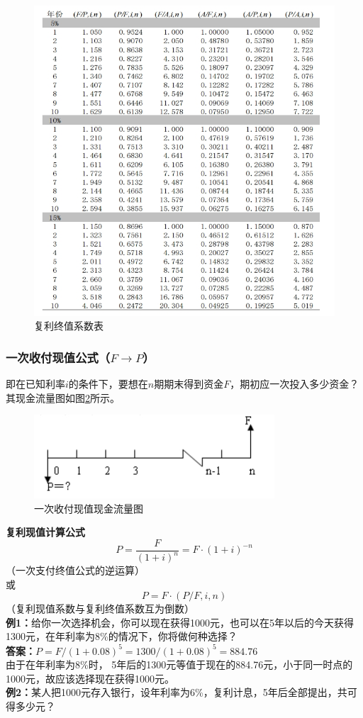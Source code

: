 \begin{figure}[H]
    \centering
    \includegraphics[width=\textwidth]{image/复利终值系数表.png}
    \caption{复利终值系数表}
    \label{fig:5}
\end{figure}

\subsubsection{一次收付现值公式（$F \to P$）}
即在已知利率$i$的条件下，要想在$n$期期末得到资金$F$，期初应一次投入多少资金？其现金流量图如图\ref{fig:6}所示。

\begin{figure}[H]
    \centering
    \includegraphics[width=0.8\textwidth]{image/一次收付现值现金流量图.png}
    \caption{一次收付现值现金流量图}
    \label{fig:6}
\end{figure}

\textbf{复利现值计算公式}
$$P=\frac{F}{(1+i)^n}=F \cdot (1+i)^{-n}$$（一次支付终值公式的逆运算）\\
或
$$P=F \cdot (P/F,i,n)$$（复利现值系数与复利终值系数互为倒数）\\
\textbf{例1：}给你一次选择机会，你可以现在获得1000元，也可以在5年以后的今天获得1300元，在年利率为8\%的情况下，你将做何种选择？\\
\textbf{答案：}$P=F/(1+0.08)^5=1300/(1+0.08)^5=884.76$\\
由于在年利率为8\%时， 5年后的1300元等值于现在的884.76元，小于同一时点的1000元，故应该选择现在获得1000元。\\
\textbf{例2：}某人把1000元存入银行，设年利率为6\%，复利计息，5年后全部提出，共可得多少元？

